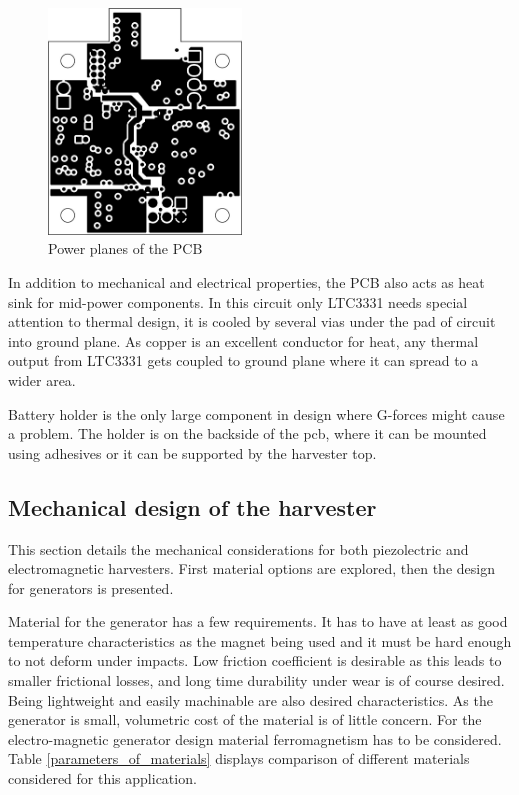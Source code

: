 \begin{figure}[htb]
  \begin{center}
    \includegraphics[height=6cm]{images/own_dwg/circuit/powerplane.jpg}
  \end{center}
  \caption{\label{fig:pcb_planes} Power planes of the PCB}
\end{figure}

In addition to mechanical and electrical properties, the PCB also acts as heat sink for mid-power components. In this circuit only LTC3331 needs special attention to thermal design, it is cooled by several vias under the pad of circuit into ground plane. As copper is an excellent conductor for heat, any thermal output from LTC3331 gets coupled to ground plane where it can spread to a wider area.

Battery holder is the only large component in design where G-forces might cause a problem. The holder is on the backside of the pcb, where it can be mounted using adhesives or it can be supported by the harvester top.

\subsection{Mechanical design of the harvester}
This section details the mechanical considerations for both piezolectric and electromagnetic harvesters. First material options are explored, then the design for generators is presented.

Material for the generator has a few requirements. It has to have at least as good temperature characteristics as the magnet being used and it must be hard enough to not deform under impacts. Low friction coefficient is desirable as this leads to smaller  frictional losses, and long time durability under wear is of course desired. Being lightweight and easily machinable are also desired characteristics. As the generator is small, volumetric cost of the material is of little concern. For the electro-magnetic generator design material ferromagnetism has to be considered. Table \ref{parameters_of_materials} displays comparison of different materials considered for this application.

